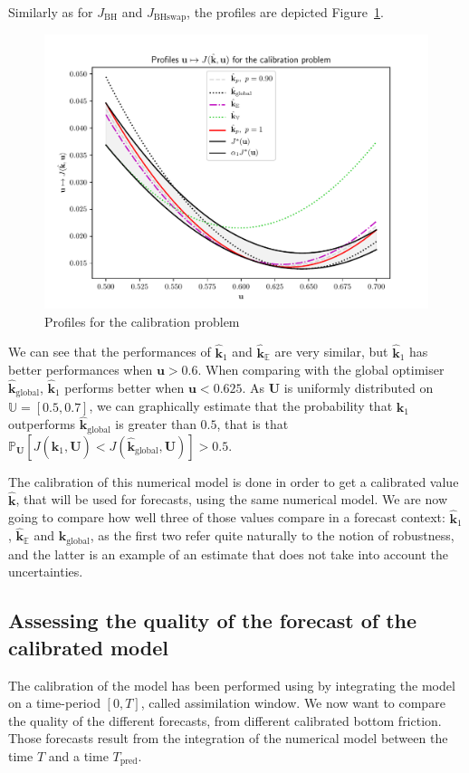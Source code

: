 \documentclass[preprint, 1p]{elsarticle}
\newcommand{\Ex}{\mathbb{E}}
\newcommand{\Prob}{\mathbb{P}}
\newcommand{\hatkmean}{\hat{\mathbf{k}}_{\Ex}}
\newcommand{\kest}{\hat{\mathbf{k}}}
\newcommand{\Uspace}{\mathbb{U}}
\newcommand{\JBH}{J_{\mathrm{BH}}}
\newcommand{\JBHS}{J_{\mathrm{BHswap}}}
\begin{document}
Similarly as for $\JBH$ and $\JBHS$, the profiles are depicted Figure~\ref{fig:profiles_swe}.
\begin{figure}[!h]
  \centering
  \includegraphics[width=.8\textwidth]{Figures/profile_swe}
  \caption{Profiles for the calibration problem}
\label{fig:profiles_swe}
\end{figure}
We can see that the performances of $\kest_1$ and $\hatkmean$ are very similar, but $\kest_1$ has better performances when $\mathbf{u} > 0.6$. When comparing with the global optimiser $\kest_{\mathrm{global}}$, $\kest_1$ performs better when $\mathbf{u}<0.625$. As $\mathbf{U}$ is uniformly distributed on $\Uspace=[0.5,0.7]$, we can graphically estimate that the probability that $\kest_1$ outperforms $\kest_{\mathrm{global}}$ is greater than $0.5$, that is that $\Prob_\mathbf{U}\left[J(\kest_1,\mathbf{U})<J(\kest_{\mathrm{global}},\mathbf{U})\right] > 0.5$.


The calibration of this numerical model is done in order to get a calibrated value $\kest$, that will be used for forecasts, using the same numerical model. We are now going to compare how well three of those values compare in a forecast context: $\kest_1$, $\hatkmean$ and $\kest_{\mathrm{global}}$, as the first two refer quite naturally to the notion of robustness, and the latter is an example of an estimate that does not take into account the uncertainties.

\subsection{Assessing the quality of the forecast of the calibrated model}
The calibration of the model has been performed using by integrating the model on a time-period $[0, T]$, called assimilation window. 
We now want to compare the quality of the different forecasts, from different calibrated bottom friction.
Those forecasts result from the integration of the numerical model between the time $T$ and a time $T_{\mathrm{pred}}$.
\end{document}
